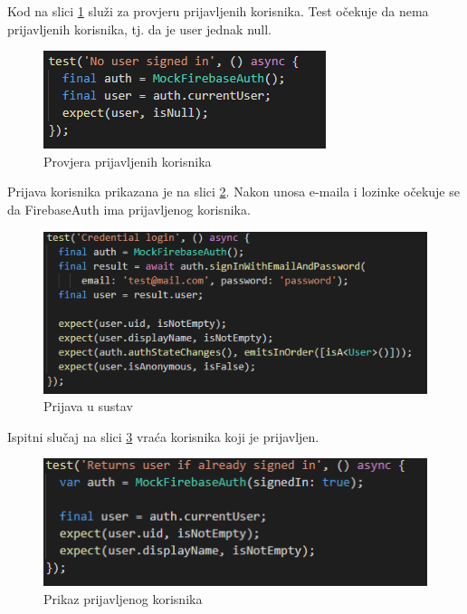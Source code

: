			
			\eject
			
			Kod na slici \ref{fig:noUser} služi za provjeru prijavljenih korisnika. Test očekuje da nema prijavljenih korisnika, tj. da je user jednak null.
			
			\begin{figure}[h]
				\includegraphics[scale=0.75]{slike/noUser.PNG}
				\centering
				\caption{Provjera prijavljenih korisnika}
				\label{fig:noUser}
			\end{figure}
			
			Prijava korisnika prikazana je na slici \ref{fig:login}. Nakon unosa e-maila i lozinke očekuje se da FirebaseAuth ima prijavljenog korisnika.
			
			\begin{figure}[h]
				\includegraphics[scale=0.75]{slike/login.PNG}
				\centering
				\caption{Prijava u sustav}
				\label{fig:login}
			\end{figure}
			
			Ispitni slučaj na slici \ref{fig:userFetch} vraća korisnika koji je prijavljen.
			
			\begin{figure}[h]
				\includegraphics[scale=0.75]{slike/userFetch.PNG}
				\centering
				\caption{Prikaz prijavljenog korisnika}
				\label{fig:userFetch}
			\end{figure}
			
